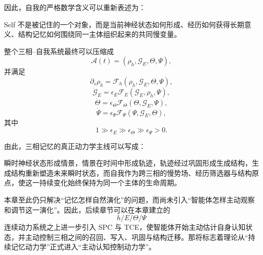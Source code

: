 因此，自我的严格数学含义可以重新表述为：

\begin{statementbox}
Self 不是被记住的一个对象，而是当前神经状态如何形成、经历如何获得长期意义、结构记忆如何围绕同一主体组织起来的共同慢变量。
\end{statementbox}

整个三相--自我系统最终可以压缩成
\[
\boxed{
\mathcal{A}(t)
=
\left(
\rho_h,
\mathcal{G}_E,
\Theta,
\Psi
\right),
}
\]
并满足
\[
\partial_s\rho_h
=
\mathcal{F}_h
\left(
\rho_h,\mathcal{G}_E,\Theta,\Psi
\right),
\]
\[
\dot{\mathcal{G}}_E
=
\epsilon_E
\mathcal{F}_E
\left(
\mathcal{G}_E,\rho_h,\Psi
\right),
\]
\[
\dot\Theta
=
\epsilon_\Theta
\mathcal{F}_\Theta
\left(
\Theta,\mathcal{G}_E,\Psi
\right),
\]
\[
\dot\Psi
=
\epsilon_\Psi
\mathcal{F}_\Psi
\left(
\Psi,\mathcal{G}_E,\Theta
\right),
\]
其中
\[
1
\gg
\epsilon_E
\gg
\epsilon_\Theta
\gg
\epsilon_\Psi
>
0.
\]

由此，三相记忆的真正动力学主线可以写成：
\begin{statementbox}
瞬时神经状态形成情景，情景在时间中形成轨迹，轨迹经过巩固形成生成结构，生成结构重新塑造未来瞬时状态，而自我作为跨三相的慢势场、经历筛选器与结构原点，使这一持续变化始终保持为同一个主体的生命周期。
\end{statementbox}

本章至此仍只解决“记忆怎样自然演化”的问题，而尚未引入“智能体怎样主动观察和调节这一演化”。因此，后续章节可以在本章建立的
\[
h/E/\Theta/\Psi
\]
连续动力系统之上进一步引入 SPC 与 TCE，使智能体开始主动估计自身认知状态，并主动控制三相之间的召回、写入、巩固与结构迁移。那将标志着理论从“持续记忆动力学”正式进入“主动认知控制动力学”。
